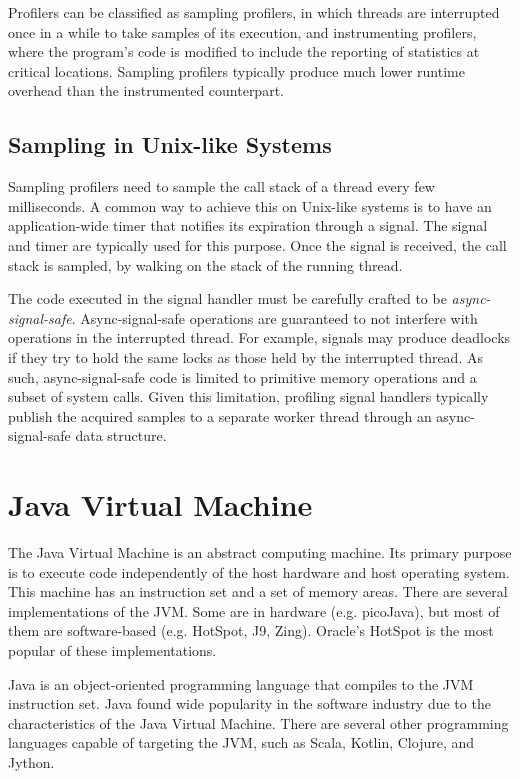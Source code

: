 Profilers can be classified as sampling profilers, in which threads are interrupted once in a while to take samples of its execution, and instrumenting profilers, where the program's code is modified to include the reporting of statistics at critical locations. Sampling profilers typically produce much lower runtime overhead than the instrumented counterpart.

\subsection{Sampling in Unix-like Systems}

Sampling profilers need to sample the call stack of a thread every few milliseconds. A common way to achieve this on Unix-like systems is to have an application-wide timer that notifies its expiration through a signal. The  signal and  timer are typically used for this purpose. Once the signal is received, the call stack is sampled, by walking on the stack of the running thread.

The code executed in the signal handler must be carefully crafted to be \emph{async-signal-safe}. Async-signal-safe operations are guaranteed to not interfere with operations in the interrupted thread. For example, signals may produce deadlocks if they try to hold the same locks as those held by the interrupted thread. As such, async-signal-safe code is limited to primitive memory operations and a subset of system calls. Given this limitation, profiling signal handlers typically publish the acquired samples to a separate worker thread through an async-signal-safe data structure.


\section{Java Virtual Machine}

The Java Virtual Machine is an abstract computing machine. Its primary purpose is to execute code independently of the host hardware and host operating system. This machine has an instruction set and a set of memory areas. There are several implementations of the JVM. Some are in hardware (e.g. picoJava), but most of them are software-based (e.g. HotSpot, J9, Zing). Oracle's HotSpot is the most popular of these implementations.

Java is an object-oriented programming language that compiles to the JVM instruction set. Java found wide popularity in the software industry due to the characteristics of the Java Virtual Machine. There are several other programming languages capable of targeting the JVM, such as Scala, Kotlin, Clojure, and Jython.

